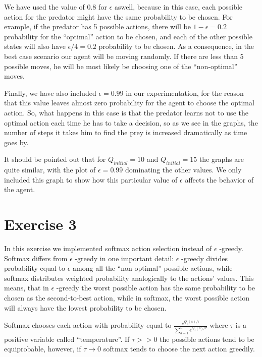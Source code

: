 \documentclass[a4paper,11pt]{article}
\begin{document}
We have used the value of 0.8 for $\epsilon$ aswell, because in this case, each possible action for the predator might have the same probability to be chosen. For example, if the predator has 5 possible actions, there will be $1-\epsilon = 0.2$ probability for the ``optimal'' action to be chosen, and each of the other possible states will also have $\epsilon /4 = 0.2$ probability to be chosen. As a consequence, in the best case scenario our agent will be moving randomly. If there are less than 5 possible moves, he will be most likely be choosing one of the ``non-optimal'' moves.


Finally, we have also included $\epsilon = 0.99$ in our experimentation, for the reason that this value leaves almost zero probability for the agent to choose the optimal action. So, what happens in this case is that the predator learns not to use the optimal action each time he has to take a decision, so as we see in the graphs, the number of steps it takes him to find the prey is increased dramatically as time goes by.


It should be pointed out that for $Q_{initial} = 10$ and $Q_{initial} = 15$ the graphs are quite similar, with the plot of $\epsilon = 0.99$ dominating the other values. We only included this graph to show how this particular value of $\epsilon$ affects the behavior of the agent.





\section*{Exercise 3}

In this exercise we implemented softmax action selection instead of $\epsilon$ -greedy. 
Softmax differs from $\epsilon$ -greedy in one important detail: $\epsilon$ -greedy divides probability equal to $\epsilon$ among all the ``non-optimal'' possible actions, while softmax distributes weighted probability analogically to the actions' values. This means, that in $\epsilon$ -greedy the worst possible action has the same probability to be chosen as the second-to-best action, while in softmax, the worst possible action will always have the lowest probability to be chosen.

Softmax chooses each action with probability equal to $\frac{e^{Q_t(a)/ \tau}}{\sum^n_{b=1} e^{Q_t(b)/ \tau}}$
where $\tau$ is a positive variable called ``temperature''. If $\tau >> 0$ the possible actions tend to be equiprobable, however, if $\tau \rightarrow 0$ softmax tends to choose the next action greedily.
\end{document}
